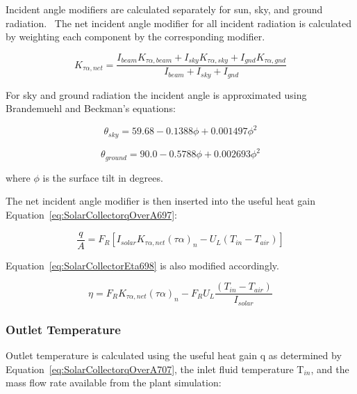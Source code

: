 Incident angle modifiers are calculated separately for sun, sky, and ground radiation.~ The net incident angle modifier for all incident radiation is calculated by weighting each component by the corresponding modifier.

\begin{equation}
{K_{\tau \alpha ,net}} = \frac{{{I_{beam}}{K_{\tau \alpha ,beam}} + {I_{sky}}{K_{\tau \alpha ,sky}} + {I_{gnd}}{K_{\tau \alpha ,gnd}}}}{{{I_{beam}} + {I_{sky}} + {I_{gnd}}}}
\end{equation}

For sky and ground radiation the incident angle is approximated using Brandemuehl and Beckman's equations:

\begin{equation}
{\theta_{sky}} = 59.68 - 0.1388\phi  + 0.001497{\phi ^2}
\end{equation}

\begin{equation}
{\theta_{ground}} = 90.0 - 0.5788\phi  + 0.002693{\phi ^2}
\end{equation}

where \(\phi\) is the surface tilt in degrees.

The net incident angle modifier is then inserted into the useful heat gain Equation~\ref{eq:SolarCollectorqOverA697}:

\begin{equation}
\frac{q}{A} = {F_R}\left[ {{I_{solar}}{K_{\tau \alpha ,net}}{{(\tau \alpha )}_n} - {U_L}({T_{in}} - {T_{air}})} \right]
\label{eq:SolarCollectorqOverA707}
\end{equation}

Equation~\ref{eq:SolarCollectorEta698} is also modified accordingly.

\begin{equation}
\eta  = {F_R}{K_{\tau \alpha ,net}}{(\tau \alpha )_n} - {F_R}{U_L}\frac{{({T_{in}} - {T_{air}})}}{{{I_{solar}}}}
\end{equation}

\subsubsection{Outlet Temperature}\label{outlet-temperature}

Outlet temperature is calculated using the useful heat gain q as determined by Equation~\ref{eq:SolarCollectorqOverA707}, the inlet fluid temperature T\(_{in}\), and the mass flow rate available from the plant simulation:

